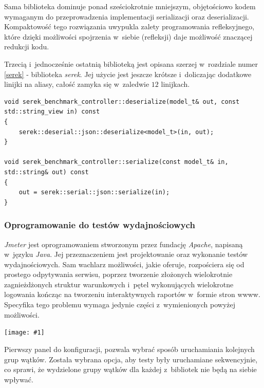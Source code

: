 \documentclass[12pt]{article}
\newcommand{\n}{\newline}
\newcommand{\putss}[3]{
\begin{captioned}[H]
	\centering
	\texttt{[image: \#1]}
	\caption{#2}
	\label{#3}
	\medskip
\end{captioned}
}
\newcommand{\nonpl}[1]{{\it #1}}
\newcommand{\Jmeter}{\nonpl{Jmeter}\texttrademark}
\newcommand{\serek}{\nonpl{serek}}
\begin{document}
{{{				Sama biblioteka dominuje ponad sześciokrotnie mniejszym, objętościowo kodem wymaganym do przeprowadzenia implementacji
				serializacji oraz deserializacji. Kompaktowość tego rozwiązania uwypukla zalety programowania refleksyjnego, które dzięki
				możliwości spojrzenia w~siebie (refleksji) daje możliwość znaczącej redukcji kodu.\n

				Trzecią i~jednocześnie ostatnią biblioteką jest opisana szerzej w~rozdziale numer \ref{serek} - biblioteka \serek.
				Jej użycie jest jeszcze krótsze i~doliczając dodatkowe linijki na aliasy, całość zamyka się w~zaledwie $12$ linijkach.\n

				\begin{captioned}[H]
					\begin{lstlisting}[frame=single]
void serek_benchmark_controller::deserialize(model_t& out, const std::string_view in) const
{
	serek::deserial::json::deserialize<model_t>(in, out);
}

void serek_benchmark_controller::serialize(const model_t& in, std::string& out) const
{
	out = serek::serial::json::serialize(in);
}
					\end{lstlisting}
					\caption{ Implementacje funkcji do serializacji i deserializacji przy wykorzystaniu biblioteki \serek}
					\label{serek_impl_source}
				\end{captioned}
			}

			{
				\subsubsection{Oprogramowanie do testów wydajnościowych}

				\Jmeter\cite{jmeter} jest oprogramowaniem stworzonym przez fundację \nonpl{Apache}, napisaną w~języku \nonpl{Java}. Jej przeznaczeniem
				jest projektowanie oraz wykonanie testów wydajnościowych. Sam wachlarz możliwości, jakie oferuje, rozpościera się od prostego odpytywania serwisu, poprzez
				tworzenie złożonych wielokrotnie zagnieżdżonych struktur warunkowych i~pętel wykonujących wielokrotne logowania kończąc na tworzeniu interaktywnych
				raportów w~formie stron wwww. Specyfika tego problemu wymaga jedynie części z~wymienionych powyżej możliwości.

				\putss{./img/jmeter_ss/main_pane.png}{ Widok ogólnej konfiguracji całego testu}{jmeter_main_config}

				Pierwszy panel do konfiguracji, pozwala wybrać sposób uruchamiania kolejnych grup wątków. Została wybrana opcja, aby testy były uruchamiane sekwencyjnie,
				co sprawi, że wydzielone grupy wątków dla każdej z~bibliotek nie będą na siebie wpływać.\n

}}}
\end{document}

